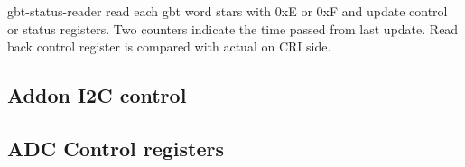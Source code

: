 \documentclass{article}
\begin{document}
gbt-status-reader read each gbt word stars with 0xE or 0xF and update control or status registers. Two counters indicate the time passed from last update. Read back control register is compared with actual on CRI side. 



\subsection{Addon I2C control}



\subsection{ADC Control registers}
\end{document}
